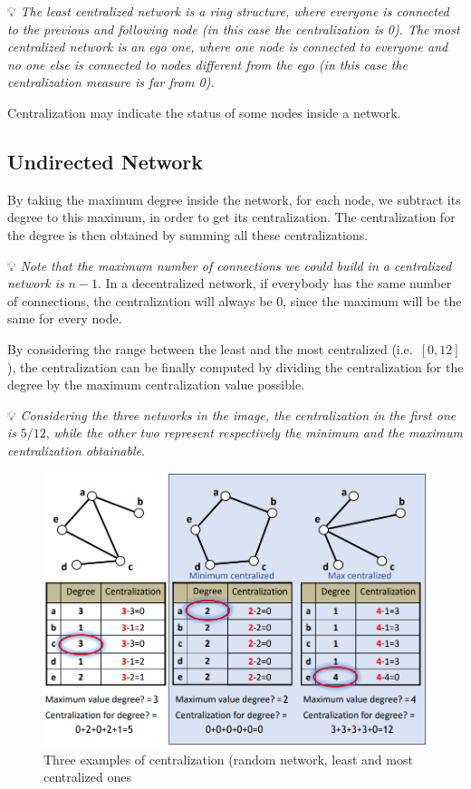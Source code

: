 \documentclass[
  notitlepage,
  onecolumn,
  openany]{book}
\begin{document}
💡 \emph{The least centralized network is a ring structure, where everyone is connected to the previous and following node (in this case the centralization is 0). The most centralized network is an ego one, where one node is connected to everyone and no one else is connected to nodes different from the ego (in this case the centralization measure is far from 0).}

Centralization may indicate the status of some nodes inside a network.

\hypertarget{undirected-network-2}{%
\subsection{Undirected Network}\label{undirected-network-2}}

By taking the maximum degree inside the network, for each node, we subtract its degree to this maximum, in order to get its centralization. The centralization for the degree is then obtained by summing all these centralizations.

💡 \emph{Note that the maximum number of connections we could build in a centralized network is} \(n-1\). In a decentralized network, if everybody has the same number of connections, the centralization will always be 0, since the maximum will be the same for every node.

By considering the range between the least and the most centralized (i.e.~\([0,12]\)), the centralization can be finally computed by dividing the centralization for the degree by the maximum centralization value possible.

💡 \emph{Considering the three networks in the image, the centralization in the first one is} \(5/12\), \emph{while the other two represent respectively the minimum and the maximum centralization obtainable}.

\begin{figure}[h!]

{\centering \includegraphics[width=0.7\linewidth]{images/02-Basic Measures/Untitled} 

}

\caption{Three examples of centralization (random network, least and most centralized ones}\label{fig:unnamed-chunk-4}
\end{figure}
\end{document}
